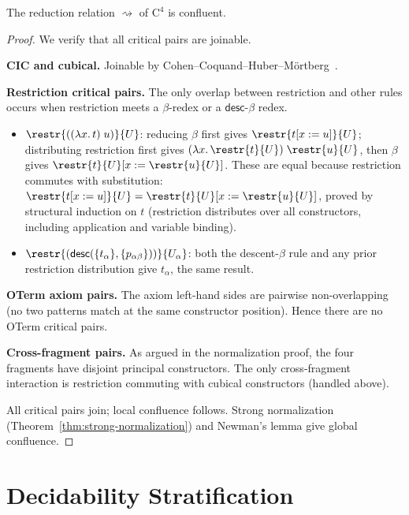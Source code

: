 \begin{theorem}
\label{thm:c4-confluence}
The reduction relation $\rightsquigarrow$ of $\mathrm{C}^4$ is confluent.
\end{theorem}

\begin{proof}
We verify that all critical pairs are joinable.

\textbf{CIC and cubical.}  Joinable by Cohen--Coquand--Huber--Mörtberg~\cite{cohen2018}.

\textbf{Restriction critical pairs.}
The only overlap between restriction and other rules occurs when restriction
meets a $\beta$-redex or a $\mathsf{desc}$-$\beta$ redex.
\begin{itemize}
\item $\restr{((\lambda x.\,t)\;u)}{U}$: reducing $\beta$ first gives
  $\restr{t[x:=u]}{U}$; distributing restriction first gives
  $(\lambda x.\,\restr{t}{U})\;\restr{u}{U}$, then $\beta$ gives
  $\restr{t}{U}[x:=\restr{u}{U}]$.
  These are equal because restriction commutes with substitution:
  $\restr{t[x:=u]}{U} = \restr{t}{U}[x:=\restr{u}{U}]$, proved
  by structural induction on $t$ (restriction distributes over all
  constructors, including application and variable binding).
\item $\restr{(\mathsf{desc}(\{t_\alpha\},\{p_{\alpha\beta}\}))}{U_\alpha}$:
  both the descent-$\beta$ rule and any prior restriction distribution
  give $t_\alpha$, the same result.
\end{itemize}

\textbf{OTerm axiom pairs.}
The axiom left-hand sides are pairwise non-overlapping (no two patterns
match at the same constructor position).  Hence there are no OTerm
critical pairs.

\textbf{Cross-fragment pairs.}
As argued in the normalization proof, the four fragments have disjoint
principal constructors.  The only cross-fragment interaction is
restriction commuting with cubical constructors (handled above).

All critical pairs join; local confluence follows.  Strong normalization
(Theorem~\ref{thm:strong-normalization}) and Newman's lemma give global
confluence.
\end{proof}


\section{Decidability Stratification}
\label{sec:decidability-stratification}

